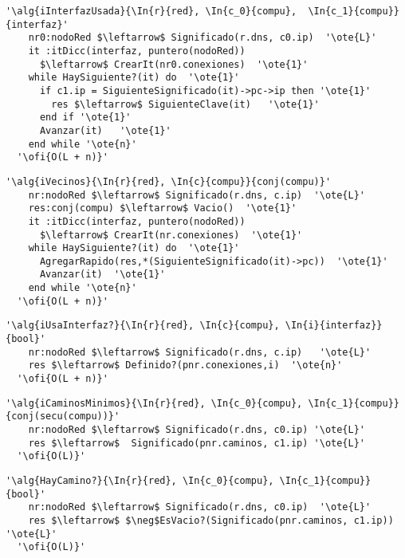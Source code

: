 \begin{lstlisting}[mathescape]
'\alg{iInterfazUsada}{\In{r}{red}, \In{c_0}{compu},  \In{c_1}{compu}}{interfaz}'
    nr0:nodoRed $\leftarrow$ Significado(r.dns, c0.ip)  '\ote{L}'
    it :itDicc(interfaz, puntero(nodoRed))
      $\leftarrow$ CrearIt(nr0.conexiones)  '\ote{1}'
    while HaySiguiente?(it) do  '\ote{1}'
      if c1.ip = SiguienteSignificado(it)->pc->ip then '\ote{1}'
        res $\leftarrow$ SiguienteClave(it)   '\ote{1}'
      end if '\ote{1}'
      Avanzar(it)   '\ote{1}'
    end while '\ote{n}'
  '\ofi{O(L + n)}'
\end{lstlisting}

\begin{lstlisting}[mathescape]
'\alg{iVecinos}{\In{r}{red}, \In{c}{compu}}{conj(compu)}'
    nr:nodoRed $\leftarrow$ Significado(r.dns, c.ip)  '\ote{L}'
    res:conj(compu) $\leftarrow$ Vacio()  '\ote{1}'
    it :itDicc(interfaz, puntero(nodoRed))
      $\leftarrow$ CrearIt(nr.conexiones)  '\ote{1}'
    while HaySiguiente?(it) do  '\ote{1}'
      AgregarRapido(res,*(SiguienteSignificado(it)->pc))  '\ote{1}'
      Avanzar(it)  '\ote{1}'
    end while '\ote{n}'
  '\ofi{O(L + n)}'
\end{lstlisting}

\begin{lstlisting}[mathescape]
'\alg{iUsaInterfaz?}{\In{r}{red}, \In{c}{compu}, \In{i}{interfaz}}{bool}'
    nr:nodoRed $\leftarrow$ Significado(r.dns, c.ip)   '\ote{L}'
    res $\leftarrow$ Definido?(pnr.conexiones,i)  '\ote{n}'
  '\ofi{O(L + n)}'
\end{lstlisting}

\begin{lstlisting}[mathescape]
'\alg{iCaminosMinimos}{\In{r}{red}, \In{c_0}{compu}, \In{c_1}{compu}}{conj(secu(compu))}'
    nr:nodoRed $\leftarrow$ Significado(r.dns, c0.ip) '\ote{L}'
    res $\leftarrow$  Significado(pnr.caminos, c1.ip) '\ote{L}'
  '\ofi{O(L)}'
\end{lstlisting}

\begin{lstlisting}[mathescape]
'\alg{HayCamino?}{\In{r}{red}, \In{c_0}{compu}, \In{c_1}{compu}}{bool}'
    nr:nodoRed $\leftarrow$ Significado(r.dns, c0.ip)  '\ote{L}'
    res $\leftarrow$ $\neg$EsVacio?(Significado(pnr.caminos, c1.ip))  '\ote{L}'
  '\ofi{O(L)}'
\end{lstlisting}

